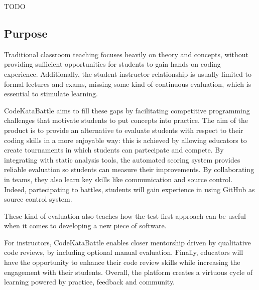 TODO
\subsection{Purpose}
Traditional classroom teaching focuses heavily on theory and concepts, without providing sufficient opportunities for students to gain hands-on coding experience.
Additionally, the student-instructor relationship is usually limited to formal lectures and exams, missing some kind of continuous evaluation, which is essential to stimulate learning.

CodeKataBattle aims to fill these gaps by facilitating competitive programming challenges that motivate students to put concepts into practice. The aim of the product is to provide an alternative to evaluate students with respect to their coding skills in a more enjoyable way: this is achieved by allowing educators to create tournaments in which students can partecipate and compete. By integrating with static analysis tools, the automated scoring system provides reliable evaluation so students can measure their improvements. By collaborating in teams, they also learn key skills like communication and source control. Indeed, partecipating to battles, students will gain experience in using GitHub as source control system.

 These kind of evaluation also teaches how the test-first approach can be useful when it comes to developing a new piece of software.

 For instructors, CodeKataBattle enables closer mentorship driven by qualitative code reviews, by including optional manual evaluation. Finally, educators will have the opportunity to enhance their code review skills while increasing the engagement with their students. Overall, the platform creates a virtuous cycle of learning powered by practice, feedback and community.

